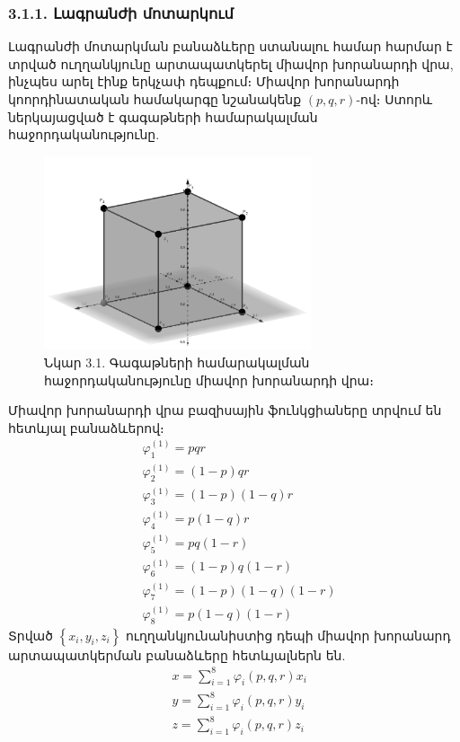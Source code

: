 \documentclass[fleqn, bachelor,subf,12pt,notitlepage]{article}
\begin{document}
\subsubsection*{ {3.1.1. Լագրանժի մոտարկում}}
Լագրանժի մոտարկման բանաձևերը ստանալու համար հարմար է տրված ուղղանկյունը արտապատկերել միավոր խորանարդի վրա, ինչպես արել էինք երկչափ դեպքում։ Միավոր խորանարդի կոորդինատական համակարգը նշանակենք $(p, q, r)$-ով։
Ստորև ներկայացված է գագաթների համարակալման հաջորդականությունը.
\begin{figure}[H]
\centering
\includegraphics[width=0.7\textwidth]{images/unit_cube}
\captionsetup{labelformat=empty}
\caption{Նկար 3.1. Գագաթների համարակալման հաջորդականությունը միավոր խորանարդի վրա։}
\end{figure}
Միավոր խորանարդի վրա բազիսային ֆունկցիաները տրվում են հետևյալ բանաձևերով։
\begin{equation}
\begin{aligned}
&\varphi^{(1)}_{1} = pqr \\
&\varphi^{(1)}_{2} = (1-p)qr \\
&\varphi^{(1)}_{3} = (1-p)(1-q)r \\
&\varphi^{(1)}_{4} = p(1-q)r \\
&\varphi^{(1)}_{5} = pq(1-r) \\
&\varphi^{(1)}_{6} = (1-p)q(1-r) \\
&\varphi^{(1)}_{7} = (1-p)(1-q)(1-r) \\
&\varphi^{(1)}_{8} = p(1-q)(1-r)
\end{aligned}
\end{equation}
Տրված $\left\{x_{i}, y_{i}, z_{i}\right\}$ ուղղանկյունանիստից դեպի միավոր խորանարդ արտապատկերման բանաձևերը հետևյալներն են.
\begin{equation}
\begin{aligned}
				&x=\sum_{i=1}^{8}\varphi_{i}\left(p, q, r\right)x_{i} \\
				&y=\sum_{i=1}^{8}\varphi_{i}\left(p, q, r\right)y_{i} \\
				&z=\sum_{i=1}^{8}\varphi_{i}\left(p, q, r\right)z_{i}
\end{aligned}
\end{equation}
\end{document}
